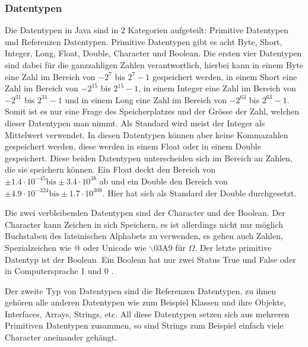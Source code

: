 \subsubsection{Datentypen}
Die Datentypen in Java sind in 2 Kategorien aufgeteilt: Primitive Datentypen und Referenzen Datentypen. Primitive Datentypen gibt es acht Byte, Short, Integer, Long, Float, Double, Character und Boolean. Die ersten vier Datentypen sind dabei für die ganzzahligen Zahlen verantwortlich, hierbei kann in einem Byte eine Zahl im Bereich von $-2^7$ bis $2^7-1$ gespeichert werden, in einem Short eine Zahl im Bereich von $-2^{15}$ bis $2^{15}-1$, in einem Integer eine Zahl im Bereich von $-2^{31}$ bis $2^{31}-1$ und in einem Long eine Zahl im Bereich von $-2^{63}$ bis $2^{63}-1$. Somit ist es nur eine Frage des Speicherplatzes und der Grösse der Zahl, welchen dieser Datentypen man nimmt. Als Standard wird meist der Integer als Mittelwert verwendet. In diesen Datentypen können aber keine Kommazahlen gespeichert werden, diese werden in einem Float oder in einem Double gespeichert. Diese beiden Datentypen unterscheiden sich im Bereich an Zahlen, die sie speichern können. Ein Float deckt den Bereich von $\pm 1.4 \cdot 10^{-45} \text{bis} \pm 3.4 \cdot 10^{38}$ ab und ein Double den Bereich von $\pm 4.9 \cdot 10^{-324} \text{bis} \pm 1.7 \cdot 10^{308}$. Hier hat sich als Standard der Double durchgesetzt.\par 
Die zwei verbleibenden Datentypen sind der Character und der Boolean. Der Character kann Zeichen in sich Speichern, es ist allerdings nicht nur möglich Buchstaben des lateinischen Alphabets zu verwenden, es gehen auch Zahlen, Spezialzeichen wie @ oder Unicode wie $\backslash$03A9 für $\Omega$. Der letzte primitive Datentyp ist der Boolean. Ein Boolean hat nur zwei Status True und False oder in Computersprache 1 und 0 \cite{studyflix_java_nodate}.\par
Der zweite Typ von Datentypen sind die Referenzen Datentypen, zu ihnen gehören alle anderen Datentypen wie zum Beispiel Klassen und ihre Objekte, Interfaces, Arrays, Strings, etc. All diese Datentypen setzen sich aus mehreren Primitiven Datentypen zusammen, so sind Strings zum Beispiel einfach viele Character aneinander gehängt.

